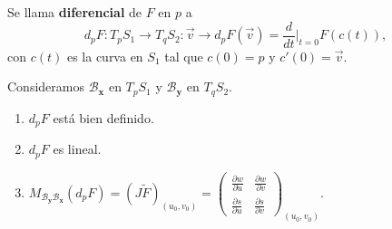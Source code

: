 \begin{definition}[Diferencial]
Se llama \textbf{diferencial} de $\displaystyle F $ en $\displaystyle p $ a
\[d _{p}F: T_{p}S_{1} \to T_{q}S_{2} : \vec{v}\to d _{p}F\left(\vec{v}\right) = \frac{d}{dt}|_{t = 0}F\left(c\left(t\right)\right) ,\]
con $\displaystyle c\left(t\right) $ es la curva en $\displaystyle S_{1} $ tal que $\displaystyle c\left(0\right)=p $ y $\displaystyle c'\left(0\right)=\vec{v} $. 
\end{definition}
\begin{prop}
Consideramos $\displaystyle \mathcal{B}_{ \textbf{x} } $ en $\displaystyle T_{p}S_{1} $ y $\displaystyle \mathcal{B}_{ \textbf{y} } $ en $\displaystyle T_{q}S_{2} $.
\begin{enumerate}
\item $\displaystyle d _{p}F $ está bien definido.
\item $\displaystyle d _{p}F $ es lineal.
\item $\displaystyle M_{\mathcal{B}_{ \textbf{y} }\mathcal{B}_{ \textbf{x} }}\left(d _{p}F\right)=\left(J\tilde{F}\right)_{\left(u_{0}, v_{0}\right)} = \begin{pmatrix} \frac{\partial w}{\partial u} & \frac{\partial w}{\partial v} \\ \frac{\partial s}{\partial u} & \frac{\partial s}{\partial v} \end{pmatrix}_{\left(u_{0}, v_{0}\right)} $.
\end{enumerate}
\end{prop}
